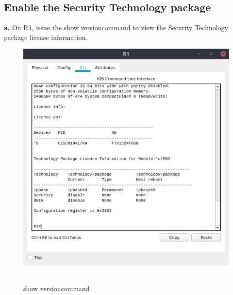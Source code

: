 \documentclass[12pt]{extarticle}
\begin{document}
\subsection{Enable the Security Technology package}
\textbf{a.} On R1, issue the show versioncommand to view the Security Technology package license information.
\begin{center}
\begin{figure}[H]
\includegraphics[scale=0.7]{resources/q02a.png}\
\caption{show versioncommand}
\end{figure}
\end{center}
\end{document}
